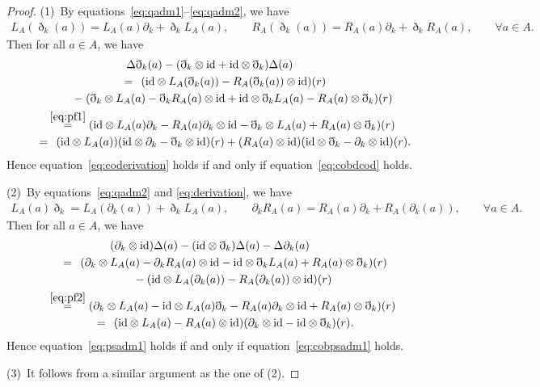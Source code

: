\documentclass[pdftex]{sigma}
\numberwithin{equation}{section}
\newcommand{\id}{\mathrm{id}}
\begin{document}
\begin{proof}
 (1)~By equations~\eqref{eq:qadm1}--\eqref{eq:qadm2}, we have
 \begin{gather}
 L_A(\eth_k(a)) = L_A(a) \partial_k + \eth_k L_A(a), \qquad\!
 R_A(\eth_k(a)) = R_A(a) \partial_k + \eth_k R_A(a), \qquad\!
 \forall a \in A.\!\!\! \label{eq:pf1}
 \end{gather}
 Then for all $a \in A$, we have
 \begin{gather*}
 \Delta \eth_k(a) - (\eth_k \otimes \id + \id \otimes \eth_k ) \Delta(a) \\
 \qquad{}\overset{\hphantom{(4.7)}}{=} (\id \otimes L_A(\eth_k(a)) - R_A(\eth_k(a)) \otimes \id )(r) \\
 \qquad\qquad {}- (\eth_k \otimes L_A(a) - \eth_k R_A(a) \otimes \id + \id \otimes \eth_k L_A(a) - R_A(a) \otimes \eth_k )(r) \\
 \qquad{}\overset{\eqref{eq:pf1}}{=} (\id \otimes L_A(a) \partial_k - R_A(a) \partial_k \otimes \id - \eth_k \otimes L_A(a) + R_A(a) \otimes \eth_k )(r) \\
 \qquad{}\overset{\hphantom{(4.7)}}{=} ( \id \otimes L_A(a) )(\id \otimes \partial_k - \eth_k \otimes \id)(r) + (R_A(a)\otimes \id )(\id \otimes \eth_k - \partial_k \otimes \id)(r).
 \end{gather*}
 Hence equation~\eqref{eq:coderivation} holds if and only if equation~\eqref{eq:cobdcod} holds.

 (2)~By equations~\eqref{eq:qadm2} and \eqref{eq:derivation}, we have
 \begin{gather}
 L_A(a) \eth_k = L_A(\partial_k(a)) + \eth_k L_A(a), \qquad\!
 \partial_k R_A(a) = R_A(a) \partial_k + R_A(\partial_k(a)), \qquad\!
 \forall a \in A.\!\!\! \label{eq:pf2}
 \end{gather}
 Then for all $a \in A$, we have
 \begin{gather*}
 (\partial_k \otimes \id)\Delta(a) - (\id \otimes \eth_k )\Delta(a) - \Delta \partial_k(a) \\
 \qquad{}\overset{\hphantom{(4.8)}}{=} ( \partial_k \otimes L_A(a) - \partial_k R_A(a) \otimes \id - \id \otimes \eth_k L_A(a) + R_A(a) \otimes \eth_k )(r) \\
 \qquad\qquad {} - (\id \otimes L_A(\partial_k(a)) - R_A(\partial_k(a)) \otimes \id )(r) \\
 \qquad{} \overset{\eqref{eq:pf2}}{=} ( \partial_k \otimes L_A(a) - \id \otimes L_A(a) \eth_k - R_A(a) \partial_k \otimes \id + R_A(a) \otimes \eth_k )(r) \\
 \qquad{} \overset{\hphantom{(4.8)}}{=} (\id \otimes L_A(a) - R_A(a) \otimes \id )(\partial_k \otimes \id - \id \otimes \eth_k)(r).
 \end{gather*}
 Hence equation~\eqref{eq:psadm1} holds if and only if equation~\eqref{eq:cobpsadm1} holds.

 (3)~It follows from a similar argument as the one of (2).
\end{proof}
\end{document}

